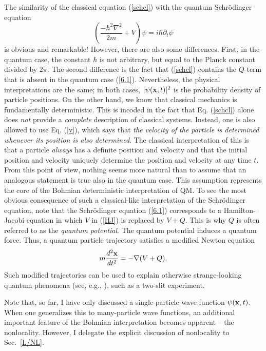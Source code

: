 \documentclass[12pt]{article}
\begin{document}
The similarity of the 
classical equation (\ref{schcl}) with the quantum Schr\"odinger 
equation 
\begin{equation}\label{6.1}  
\left( \frac{-\hbar^2 \nabla^2}{2m} +V \right) \psi=
i\hbar \partial_t \psi            
\end{equation}
is obvious and remarkable! However, there are also some differences.
First, in the quantum case, the constant $\hbar$ is not arbitrary, 
but equal to the Planck constant divided by $2\pi$. The second
difference is the fact that (\ref{schcl}) contains 
the $Q$-term that is absent in the quantum case (\ref{6.1}).
Nevertheless, the physical interpretations are the same; in both cases, 
$|\psi({\bf x},t)|^2$ is the probability density of particle positions.
On the other hand, we know that classical mechanics is 
fundamentally deterministic.
This is incoded in the fact that Eq. (\ref{schcl}) alone does {\em not} 
provide a {\em complete} description of classical systems. 
Instead, one is also allowed to use Eq. (\ref{v}), which says
that {\em the velocity of the particle is determined whenever its
position is also determined}. The classical interpretation of 
this is that a particle {\em always} has a definite position 
and velocity and that the initial position and velocity uniquely 
determine the position and velocity at any time $t$. From this point 
of view, nothing seems more natural than to assume that 
an analogous statement is true also in the quantum case. 
This assumption represents the core of the Bohmian 
deterministic interpretation of QM.
To see the most obvious consequence of such a classical-like
interpretation of the Schr\"odinger equation,
note that the Schr\"odinger equation (\ref{6.1})
corresponds to a Hamilton-Jacobi equation in which 
$V$ in (\ref{HJ}) is replaced by $V+Q$. 
This is why $Q$ is often referred to as 
the {\em quantum potential}. The quantum potential induces a 
quantum force. Thus, a quantum particle trajectory satisfies  
a modified Newton equation
\begin{equation}\label{qnewt}
m\frac{d^2{\bf x}}{dt^2}=-\nabla(V+Q) .
\end{equation}
Such modified trajectories can be used to explain otherwise 
strange-looking quantum phenomena (see, e.g., \cite{pas}),
such as a two-slit experiment. 

%
Note that, so far, I have only discussed a single-particle
wave function $\psi({\bf x},t)$. When one generalizes this
to many-particle wave functions, an additional important feature
of the Bohmian interpretation becomes apparent -- the nonlocality. 
However, I delegate the explicit discussion of nonlocality to Sec.~\ref{L/NL}.
\end{document}
